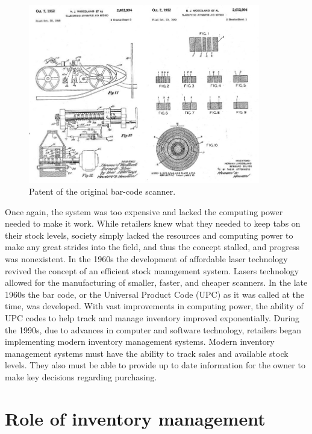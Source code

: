 \begin{figure}[h!]
	\caption{Patent of the original bar-code scanner.}
	\label{image:myImageName}
	\centering
	\includegraphics[width=0.9\textwidth]{Fig images/patent.png}
\end{figure}

Once again, the system was too expensive and lacked the computing power needed to make it work. While retailers knew what they needed to keep tabs on their stock levels, society simply lacked the resources and computing power to make any great strides into the field, and thus the concept stalled, and progress was nonexistent.
\newline
\newline
In the 1960s the development of affordable laser technology revived the concept of an efficient stock management system. Lasers technology allowed for the manufacturing of smaller, faster, and cheaper scanners. In the late 1960s the bar code, or the Universal Product Code (UPC) as it was called at the time, was developed. With vast improvements in computing power, the ability of UPC codes to help track and manage inventory improved exponentially.
\newline
\newline
During the 1990s, due to advances in computer and software technology, retailers began implementing modern inventory management systems. Modern inventory management systems must have the ability to track sales and available stock levels. They also must be able to provide up to date information for the owner to make key decisions regarding purchasing.

\section{Role of inventory management}

